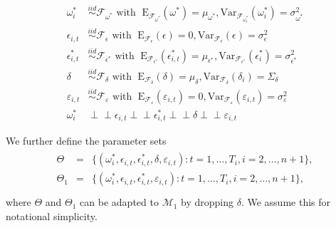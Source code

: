 \documentclass[11pt]{article}
\newcommand{\simiid}{\stackrel{iid}{\sim}} %
\newcommand{\indep}{\perp \!\!\! \perp } %
\def\mrm#1{\mathrm{#1}} %
\def\mc#1{\mathcal{#1}} %
\def\mc#1{\mathcal{#1}}
\theoremstyle{definition}
\begin{document}
  \begin{align*}
    \omega^{*}_i &\simiid \mc{F}_{\omega^{*}} \text{ with }  \; \mrm{E}_{\mc{F}_{\omega^{*}}}(\omega^{*}) = \mu_{\omega^{*}}, \mrm{Var}_{\mc{F}_{\omega^{*}_i}}(\omega^{*}_i)  = \sigma^2_{\omega^{*}}  \\
    \epsilon_{i,t} &\simiid \mc{F}_{\epsilon} \text{ with }  \; \mrm{E}_{\mc{F}_{\epsilon}}(\epsilon) = 0, \mrm{Var}_{\mc{F}_{\epsilon}}(\epsilon)  = \sigma^2_{\epsilon}  \\
    \epsilon^{*}_{i,t} &\simiid \mc{F}_{\epsilon^{*}} \text{ with }  \; \mrm{E}_{\mc{F}_{\epsilon^{*}}}(\epsilon^{*}_{i,t}) = \mu_{\epsilon^{*}}, \mrm{Var}_{\mc{F}_{\epsilon^{*}}}(\epsilon^{*}_i)  = \sigma^2_{\epsilon^{*}}  \\
    \delta &\simiid \mc{F}_{\delta} \text{ with }  \; \mrm{E}_{\mc{F}_{\delta}}(\delta) = \mu_{\delta}, \mrm{Var}_{\mc{F}_{\delta}}(\delta_i)  = \Sigma_{\delta} \\
    \varepsilon_{i,t} & \simiid  \mc{F}_{\varepsilon} \text{ with }  \; \mrm{E}_{\mc{F}_{\varepsilon}}(\varepsilon_{i,t}) = 0, \mrm{Var}_{\mc{F}_{\varepsilon}}(\varepsilon_{i,t}) = \sigma^2_{\varepsilon}\\
    \omega^{*}_i & \indep  \epsilon_{i,t} \indep  \epsilon^{*}_{i,t} \indep \delta \indep \varepsilon_{i,t}
    \end{align*}

    We further define the parameter sets
    \begin{align}
      \begin{array}{lll}
         \Theta &= &\{(\omega^{*}_i, \epsilon_{i,t}, \epsilon^{*}_{i,t}, \delta,\varepsilon_{i,t})\colon t= 1, \ldots, T_i, i = 2, \ldots, n +1\},\\
         \Theta_{1} &= &\{(\omega^{*}_i, \epsilon_{i,t}, \epsilon^{*}_{i,t}, \varepsilon_{i,t})\colon t= 1, \ldots, T_i, i = 2, \ldots, n +1\},\\
      \end{array}
    \end{align}\label{parameter}
    where $\Theta$ and $\Theta_1$ can be adapted to $\mc{M}_1$ by dropping $\delta$. We assume this for notational simplicity.
\end{document}
